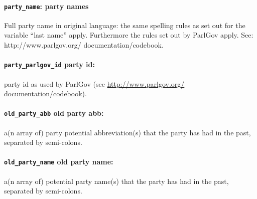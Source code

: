 \documentclass{article}
\begin{document}
\paragraph{\texttt{party\_name}: party names} Full party name in original language: the same spelling rules as set out for the variable “last name” apply. Furthermore the rules set out by ParlGov apply. See: http://www.parlgov.org/ documentation/codebook.\\

\paragraph{\texttt{party\_parlgov\_id} party id:} party id as used by ParlGov (see \url{http://www.parlgov.org/ documentation/codebook}).\\

\paragraph{\texttt{old\_party\_abb} old party abb:} a(n array of) party potential abbreviation(s) that the party has had in the past, separated by semi-colons.\\

\paragraph{\texttt{old\_party\_name} old party name:} a(n array of) potential party name(s) that the party has had in the past, separated by semi-colons.\\


\end{document}
